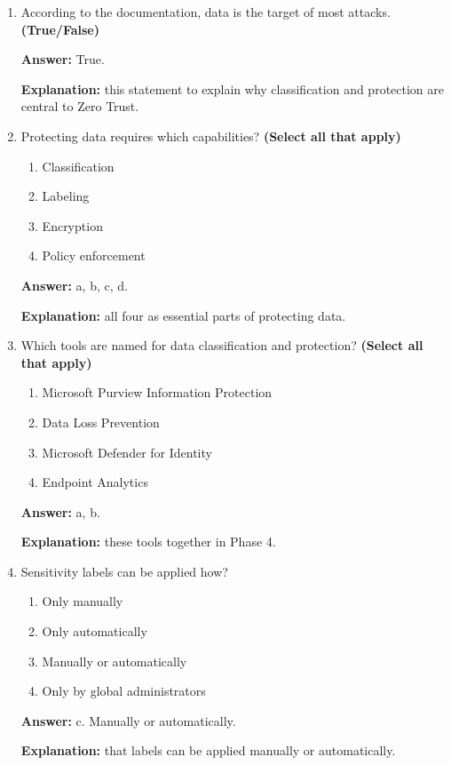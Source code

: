 \documentclass[10pt]{article}
\begin{document}
\begin{enumerate}[leftmargin=*]
\textbf{Explanation:} Phase 4 is specifically named Classify and protect data.

\item According to the documentation, data is the target of most attacks. \textbf{(True/False)}

\textbf{Answer:} True.

\textbf{Explanation:} this statement to explain why classification and protection are central to Zero Trust.

\item Protecting data requires which capabilities? \textbf{(Select all that apply)}
\begin{enumerate}[label=\alph*., leftmargin=1.5em]
\item Classification
\item Labeling
\item Encryption
\item Policy enforcement
\end{enumerate}
\textbf{Answer:} a, b, c, d.

\textbf{Explanation:} all four as essential parts of protecting data.

\item Which tools are named for data classification and protection? \textbf{(Select all that apply)}
\begin{enumerate}[label=\alph*., leftmargin=1.5em]
\item Microsoft Purview Information Protection
\item Data Loss Prevention
\item Microsoft Defender for Identity
\item Endpoint Analytics
\end{enumerate}
\textbf{Answer:} a, b.

\textbf{Explanation:} these tools together in Phase 4.

\item Sensitivity labels can be applied how?
\begin{enumerate}[label=\alph*., leftmargin=1.5em]
\item Only manually
\item Only automatically
\item Manually or automatically
\item Only by global administrators
\end{enumerate}
\textbf{Answer:} c. Manually or automatically.

\textbf{Explanation:} that labels can be applied manually or automatically.


\end{enumerate}
\end{document}
